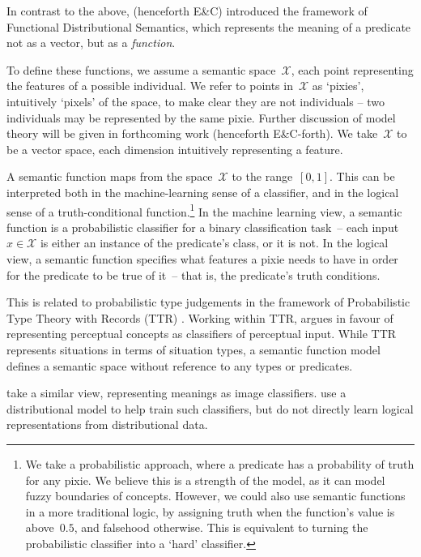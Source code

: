\documentclass[11pt]{article}
\begin{document}
In contrast to the above,
 (henceforth E\&C)
introduced the framework of Functional Distributional Semantics,
which represents the meaning of a predicate not as a vector, but as a \textit{function}.

To define these functions,
we assume a semantic space~$\mathcal{X}$,
each point representing the features of a possible individual.
We refer to points in~$\mathcal{X}$ as `pixies',
intuitively `pixels' of the space,
to make clear they are not individuals --
two individuals may be represented by the same pixie.
Further discussion of model theory will be given in forthcoming work
\citep{emerson-forth} (henceforth E\&C-forth).
We take~$\mathcal{X}$ to be a vector space,
each dimension intuitively representing a feature.

A semantic function maps from the space~$\mathcal{X}$ to the range~$[0,1]$.
This can be interpreted both in the machine-learning sense of a classifier,
and in the logical sense of a truth-conditional function.\footnote{%
  We take a probabilistic approach,
  where a predicate has a probability of truth for any pixie.
  We believe this is a strength of the model,
  as it can model fuzzy boundaries of concepts.
  However, we could also use semantic functions in a more traditional logic,
  by assigning truth when the function's value is above~$0.5$, and falsehood otherwise.
  This is equivalent to turning the probabilistic classifier into a `hard' classifier.
}
In the machine learning view,
a semantic function is a probabilistic classifier for a binary classification task~--
each input $x\in\mathcal{X}$ is either an instance of the predicate's class, or it is not.
In the logical view,
a semantic function specifies what features a pixie needs to have
in order for the predicate to be true of it~--
that is, the predicate's truth conditions.

This is related to probabilistic type judgements in the framework of
Probabilistic Type Theory with Records (TTR) \cite{cooper2005type,cooper2015prob}.
Working within TTR,
 argues in favour of
representing perceptual concepts as classifiers of perceptual input.
While TTR represents situations in terms of situation types,
a semantic function model defines a semantic space without reference to any types or predicates.

take a similar view, representing meanings as image classifiers.
use a distributional model to help train such classifiers,
but do not directly learn logical representations from distributional data.
\end{document}
